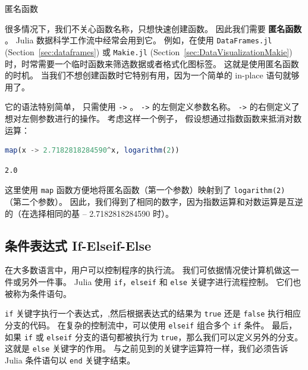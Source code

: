 \documentclass[
  notoc %
]{tufte-book}
\makeatletter
\newcommand{\passthrough}[1]{#1}
\renewcommand\subsubsection{%
\@startsection{subsubsection}{3}{\z@ }{-3.25ex\@plus -1ex \@minus -.2ex}{1.5ex \@plus .2ex}{\normalfont \normalsize \bfseries }
}
\makeatother
\begin{document}
\hypertarget{sec:function_anonymous}{%
\subsubsection{匿名函数}\label{sec:function_anonymous}}

很多情况下，我们不关心函数名称，只想快速创建函数。 因此我们需要
\textbf{匿名函数} 。 Julia 数据科学工作流中经常会用到它。 例如，在使用
\passthrough{\lstinline!DataFrames.jl!} (Section~\ref{sec:dataframes})
或 \passthrough{\lstinline!Makie.jl!}
(Section~\ref{sec:DataVisualizationMakie})
时，时常需要一个临时函数来筛选数据或者格式化图标签。
这就是使用匿名函数的时机。
当我们不想创建函数时它特别有用，因为一个简单的 in-place 语句就够用了。

它的语法特别简单， 只需使用 \passthrough{\lstinline!->!} 。
\passthrough{\lstinline!->!} 的左侧定义参数名称。
\passthrough{\lstinline!->!} 的右侧定义了想对左侧参数进行的操作。
考虑这样一个例子， 假设想通过指数函数来抵消对数运算：

\begin{lstlisting}[language=Julia]
map(x -> 2.7182818284590^x, logarithm(2))
\end{lstlisting}

\begin{lstlisting}[language=Output]
2.0
\end{lstlisting}

这里使用 \passthrough{\lstinline!map!}
函数方便地将匿名函数（第一个参数）映射到了
\passthrough{\lstinline!logarithm(2)!} （第二个参数）。
因此，我们得到了相同的数字，因为指数运算和对数运算是互逆的（在选择相同的基
-- 2.7182818284590 时）。

\hypertarget{sec:conditionals}{%
\subsection{条件表达式 If-Elseif-Else}\label{sec:conditionals}}

在大多数语言中，用户可以控制程序的执行流。
我们可依据情况使计算机做这一件或另外一件事。 Julia 使用
\passthrough{\lstinline!if!}，\passthrough{\lstinline!elseif!} 和
\passthrough{\lstinline!else!} 关键字进行流程控制。
它们也被称为条件语句。

\passthrough{\lstinline!if!}
关键字执行一个表达式，,然后根据表达式的结果为
\passthrough{\lstinline!true!} 还是 \passthrough{\lstinline!false!}
执行相应分支的代码。 在复杂的控制流中，可以使用
\passthrough{\lstinline!elseif!} 组合多个 \passthrough{\lstinline!if!}
条件。 最后，如果 \passthrough{\lstinline!if!} 或
\passthrough{\lstinline!elseif!} 分支的语句都被执行为
\passthrough{\lstinline!true!}，那么我们可以定义另外的分支。 这就是
\passthrough{\lstinline!else!} 关键字的作用。
与之前见到的关键字运算符一样，我们必须告诉 Julia 条件语句以
\passthrough{\lstinline!end!} 关键字结束。
\end{document}
